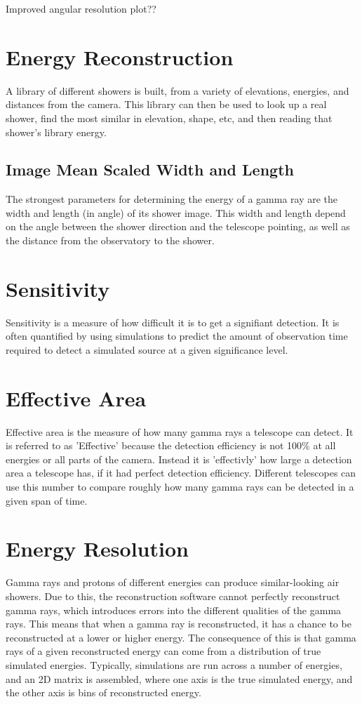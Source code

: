 Improved angular resolution plot??

\section{Energy Reconstruction}\label{subsec:enrecon}
A library of different showers is built, from a variety of elevations, energies, and distances from the camera.
This library can then be used to look up a real shower, find the most similar in elevation, shape, etc, and then reading that shower's library energy.

\subsection{Image Mean Scaled Width and Length}
The strongest parameters for determining the energy of a gamma ray are the width and length (in angle) of its shower image.
This width and length depend on the angle between the shower direction and the telescope pointing, as well as the distance from the observatory to the shower.


\section{Sensitivity}
Sensitivity is a measure of how difficult it is to get a signifiant detection.
It is often quantified by using simulations to predict the amount of observation time required to detect a simulated source at a given significance level.


\section{Effective Area}
Effective area is the measure of how many gamma rays a telescope can detect.
It is referred to as 'Effective' because the detection efficiency is not 100\% at all energies or all parts of the camera.
Instead it is 'effectivly' how large a detection area a telescope has, if it had perfect detection efficiency.
Different telescopes can use this number to compare roughly how many gamma rays can be detected in a given span of time.


\section{Energy Resolution}
Gamma rays and protons of different energies can produce similar-looking air showers.
Due to this, the reconstruction software cannot perfectly reconstruct gamma rays, which introduces errors into the different qualities of the gamma rays.
This means that when a gamma ray is reconstructed, it has a chance to be reconstructed at a lower or higher energy.
The consequence of this is that gamma rays of a given reconstructed energy can come from a distribution of true simulated energies.
Typically, simulations are run across a number of energies, and an 2D matrix is assembled, where one axis is the true simulated energy, and the other axis is bins of reconstructed energy.


